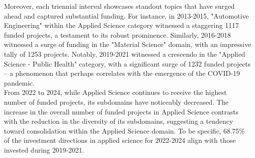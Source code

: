Moreover, each triennial interval showcases standout topics that have surged ahead and captured substantial funding. For instance, in 2013-2015, "Automotive Engineering" within the Applied Science category witnessed a staggering 1117 funded projects, a testament to its robust prominence. Similarly, 2016-2018 witnessed a surge of funding in the "Material Science" domain, with an impressive tally of 1253 projects. Notably, 2019-2021 witnessed a crescendo in the "Applied Science - Public Health" category, with a significant surge of 1232 funded projects – a phenomenon that perhaps correlates with the emergence of the COVID-19 pandemic.\\

From 2022 to 2024, while Applied Science continues to receive the highest number of funded projects, its subdomains have noticeably decreased. The increase in the overall number of funded projects in Applied Science contrasts with the reduction in the diversity of its subdomains, suggesting a tendency toward consolidation within the Applied Science domain. To be specific, 68.75\% of the investment directions in applied science for 2022-2024 align with those invested during 2019-2021.\\


